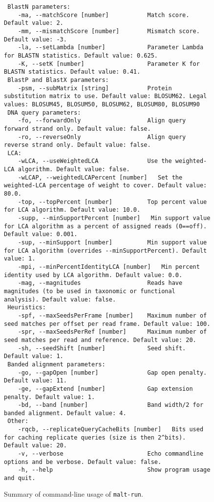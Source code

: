\documentclass[11pt]{article}
\begin{document}
\begin{figure}[h]
{\begin{verbatim}
 BlastN parameters:
	-ma, --matchScore [number]           Match score. Default value: 2.
	-mm, --mismatchScore [number]        Mismatch score. Default value: -3.
	-la, --setLambda [number]            Parameter Lambda for BLASTN statistics. Default value: 0.625.
	-K, --setK [number]                  Parameter K for BLASTN statistics. Default value: 0.41.
 BlastP and BlastX parameters:
	-psm, --subMatrix [string]           Protein substitution matrix to use. Default value: BLOSUM62. Legal values: BLOSUM45, BLOSUM50, BLOSUM62, BLOSUM80, BLOSUM90
 DNA query parameters:
	-fo, --forwardOnly                   Align query forward strand only. Default value: false.
	-ro, --reverseOnly                   Align query reverse strand only. Default value: false.
 LCA:
	-wLCA, --useWeightedLCA              Use the weighted-LCA algorithm. Default value: false.
	-wLCAP, --weightedLCAPercent [number]   Set the weighted-LCA percentage of weight to cover. Default value: 80.0.
	-top, --topPercent [number]          Top percent value for LCA algorithm. Default value: 10.0.
	-supp, --minSupportPercent [number]   Min support value for LCA algorithm as a percent of assigned reads (0==off). Default value: 0.001.
	-sup, --minSupport [number]          Min support value for LCA algorithm (overrides --minSupportPercent). Default value: 1.
	-mpi, --minPercentIdentityLCA [number]   Min percent identity used by LCA algorithm. Default value: 0.0.
	-mag, --magnitudes                   Reads have magnitudes (to be used in taxonomic or functional analysis). Default value: false.
 Heuristics:
	-spf, --maxSeedsPerFrame [number]    Maximum number of seed matches per offset per read frame. Default value: 100.
	-spr, --maxSeedsPerRef [number]      Maximum number of seed matches per read and reference. Default value: 20.
	-sh, --seedShift [number]            Seed shift. Default value: 1.
 Banded alignment parameters:
	-go, --gapOpen [number]              Gap open penalty. Default value: 11.
	-ge, --gapExtend [number]            Gap extension penalty. Default value: 1.
	-bd, --band [number]                 Band width/2 for banded alignment. Default value: 4.
 Other:
	-rqcb, --replicateQueryCacheBits [number]   Bits used for caching replicate queries (size is then 2^bits). Default value: 20.
	-v, --verbose                        Echo commandline options and be verbose. Default value: false.
	-h, --help                           Show program usage and quit.\end{verbatim}
}
\caption{Summary of command-line usage of {\tt malt-run}.}\label{fig:malt-run-usage}
\end{figure}


\FloatBarrier

{\small


}

\printindex
\end{document}
